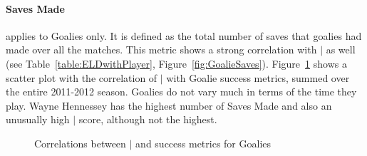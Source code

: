 {	 
	\paragraph{Saves Made} applies to Goalies only. It is defined as the total number of saves that goalies had made over all the matches. This metric shows a strong correlation with $\mid$ as well (see Table~\ref{table:ELDwithPlayer}, Figure~\ref{fig:GoalieSaves}).  
	Figure~\ref{fig:goaliesELD} shows a scatter plot with the correlation of $\mid$ with Goalie success metrics, summed over the entire 2011-2012 season. Goalies do not vary much in terms of the time they play. Wayne Hennessey has the highest number of Saves Made and also an unusually high $\mid$ score, although not the highest. 


	
	\begin{figure}
		\centering     %
		\caption{Correlations between $\mid$ and success metrics for Goalies \label{fig:goaliesELD}}
	\end{figure}


}
